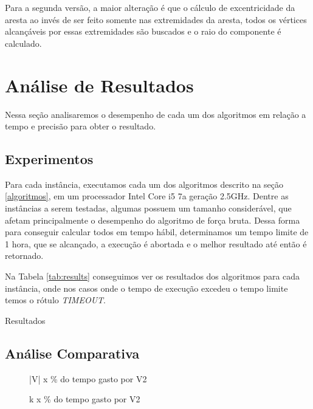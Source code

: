 
Para a segunda versão, a maior alteração é que o cálculo de excentricidade da aresta ao invés de ser feito somente nas extremidades da aresta, todos os vértices alcançáveis por essas extremidades são buscados e o raio do componente é calculado.

\section{\esp Análise de Resultados} \label{sec:resultados}


Nessa seção analisaremos o desempenho de cada um dos algoritmos em relação a tempo e precisão para obter o resultado.

\subsection{\esp Experimentos}

Para cada instância, executamos cada um dos algoritmos descrito na seção \ref{algoritmos}, em um processador Intel Core i5 7a geração 2.5GHz. Dentre as instâncias a serem testadas, algumas possuem um tamanho considerável, que afetam principalmente o desempenho do algoritmo de força bruta. Dessa forma para conseguir calcular todos em tempo hábil, determinamos um tempo limite de 1 hora, que se alcançado, a execução é abortada e o melhor resultado até então é retornado. 

Na Tabela \ref{tab:results} conseguimos ver os resultados dos algoritmos para cada instância, onde nos casos onde o tempo de execução excedeu o tempo limite temos o rótulo \textit{TIMEOUT}.

\begin{table}[h]
\centering
{}
\caption{Resultados}
\label{tab:results}
\end{table}

\subsection{\esp Análise Comparativa}

\begin{figure}
\centering
\begin{minipage}{.5\textwidth}
  \centering
  
  \caption{|V| x \% do tempo gasto por V2}
    \label{fig:tempoxv} 
\end{minipage}%
\begin{minipage}{.5\textwidth}
  \centering
  
  \caption{k x \% do tempo gasto por V2}
    \label{fig:tempoxk} 
\end{minipage}
\end{figure}

